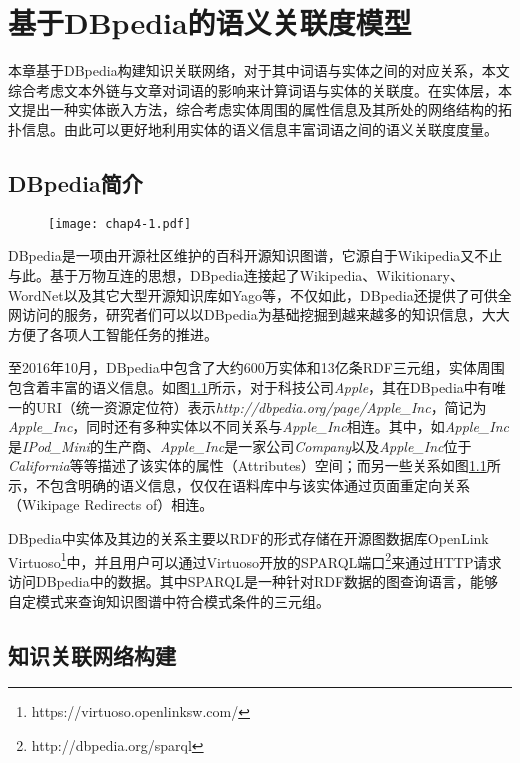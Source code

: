 \chapter{基于DBpedia的语义关联度模型}
\label{chap:chap04}

本章基于DBpedia构建知识关联网络，对于其中词语与实体之间的对应关系，本文综合考虑文本外链与文章对词语的影响来计算词语与实体的关联度。在实体层，本文提出一种实体嵌入方法，综合考虑实体周围的属性信息及其所处的网络结构的拓扑信息。由此可以更好地利用实体的语义信息丰富词语之间的语义关联度度量。

\section{DBpedia简介}

\begin{figure}[!ht]
    \centerline{\texttt{[image: chap4-1.pdf]}}
    \label{chap4-1}
\end{figure}

DBpedia是一项由开源社区维护的百科开源知识图谱，它源自于Wikipedia又不止与此。基于万物互连的思想，DBpedia连接起了Wikipedia、Wikitionary、WordNet以及其它大型开源知识库如Yago等，不仅如此，DBpedia还提供了可供全网访问的服务，研究者们可以以DBpedia为基础挖掘到越来越多的知识信息，大大方便了各项人工智能任务的推进。

至2016年10月，DBpedia中包含了大约600万实体和13亿条RDF三元组，实体周围包含着丰富的语义信息。如图\ref{chap4-1}所示，对于科技公司\emph{Apple}，其在DBpedia中有唯一的URI（统一资源定位符）表示\emph{http://dbpedia.org/page/Apple\_Inc}，简记为\emph{Apple\_Inc}，同时还有多种实体以不同关系与\emph{Apple\_Inc}相连。其中，如\emph{Apple\_Inc}是\emph{IPod\_Mini}的生产商、\emph{Apple\_Inc}是一家公司\emph{Company}以及\emph{Apple\_Inc}位于\emph{California}等等描述了该实体的属性（Attributes）空间；而另一些关系如图\ref{chap4-1}所示，不包含明确的语义信息，仅仅在语料库中与该实体通过页面重定向关系（Wikipage Redirects of）相连。

DBpedia中实体及其边的关系主要以RDF的形式存储在开源图数据库OpenLink Virtuoso\footnote{https://virtuoso.openlinksw.com/}中，并且用户可以通过Virtuoso开放的SPARQL端口\footnote{http://dbpedia.org/sparql}来通过HTTP请求访问DBpedia中的数据。其中SPARQL是一种针对RDF数据的图查询语言，能够自定模式来查询知识图谱中符合模式条件的三元组。


\section{知识关联网络构建}

